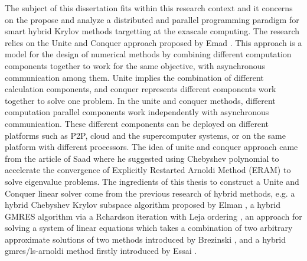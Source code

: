 The subject of this dissertation fits within this research context and it concerns on the propose and analyze a distributed and parallel programming paradigm for smart hybrid Krylov methods targetting at the exascale computing. The research relies on the Unite and Conquer approach proposed by Emad \cite{emad2016unite}. This approach is a model for the design of numerical methods by combining different computation components together to work for the same objective, with asynchronous communication among them. Unite implies the combination of different calculation components, and conquer represents different components work together to solve one problem. In the unite and conquer methods, different computation parallel components work independently with asynchronous communication. These different components can be deployed on different platforms such as P2P, cloud and the supercomputer systems, or on the same platform with different processors. The idea of unite and conquer approach came from the article of Saad \cite{saad1984chebyshev} where he suggested using Chebyshev polynomial to accelerate the convergence of Explicitly Restarted Arnoldi Method (ERAM) to solve eigenvalue problems. The ingredients of this thesis to construct a Unite and Conquer linear solver come from the previous research of hybrid methods, e.g. a hybrid Chebyshev Krylov subspace algorithm proposed by Elman \cite{elman1986hybrid}, a hybrid GMRES algorithm via a Rchardson iteration with Leja ordering \cite{nachtigal1992hybrid}, an approach for solving a system of linear equations which takes a combination of two arbitrary approximate solutions of two methods introduced by Brezinski \cite{brezinski1994hybrid}, and a hybrid gmres/ls-arnoldi method firstly introduced by Essai \cite{essai1999heterogeneous}.

